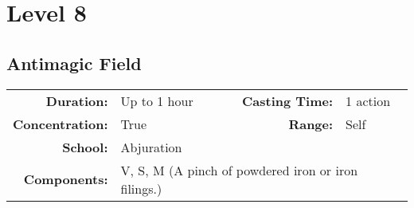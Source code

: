 \documentclass[a5paper, 12pt]{memoir}
\begin{document}
\newpage
\chapter*{Level 8} 
\section*{Antimagic Field}

{
\small\centering\vspace{-6pt}
\begin{tabular}{rlrl}
\toprule

\textbf{Duration:} & Up to 1 hour &
\textbf{Casting Time:} & 1 action \\
\textbf{Concentration:} & True &
\textbf{Range:} & Self \\
\textbf{School:} & Abjuration \\
\textbf{Components:} & \multicolumn{3}{p{0.7\textwidth}}{V, S, M (A pinch of powdered iron or iron filings.)}\\

\bottomrule
\end{tabular}
}
\end{document}

